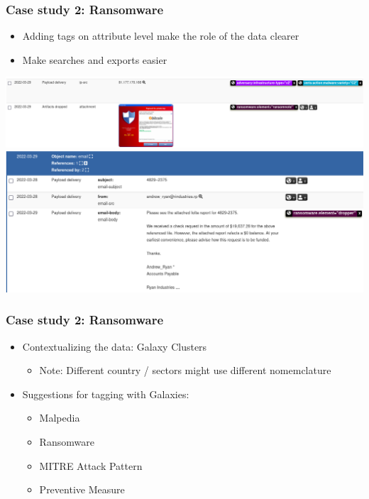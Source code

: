 \begin{frame}
    \frametitle{Case study 2: Ransomware}
    \begin{itemize}
        \item Adding tags on attribute level make the role of the data clearer
        \item Make searches and exports easier
    \end{itemize}
    \includegraphics[width=1.0\linewidth]{pictures/case2/attribute-tags2.png}
    \includegraphics[width=1.0\linewidth]{pictures/case2/attribute-tags3.png}
\end{frame}

\begin{frame}
    \frametitle{Case study 2: Ransomware}
    \begin{itemize}
        \item Contextualizing the data: Galaxy Clusters
        \begin{itemize}
            \item Note: Different country / sectors might use different nomemclature
        \end{itemize}
        \item Suggestions for tagging with Galaxies:
        \begin{itemize}
            \item Malpedia
            \item Ransomware
            \item MITRE Attack Pattern
            \item Preventive Measure
        \end{itemize}
    \end{itemize}
\end{frame}


